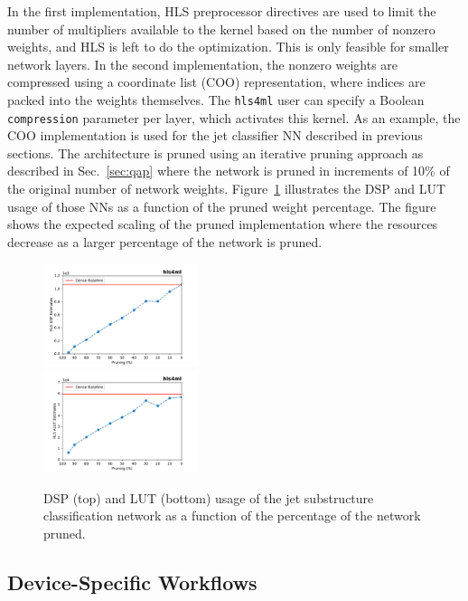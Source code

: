 \documentclass[tinyml]{acmart}
\newcommand{\hlsfml}{\texttt{hls4ml}\xspace}
\begin{document}
In the first implementation, HLS preprocessor directives are used to limit the number of multipliers available to the kernel based on the number of nonzero weights, and HLS is left to do the optimization.
This is only feasible for smaller network layers.
In the second implementation, the nonzero weights are compressed using a coordinate list (COO) representation, where indices are packed into the weights themselves.
The \hlsfml user can specify a Boolean \texttt{compression} parameter per layer, which activates this kernel.
As an example, the COO implementation is used for the jet classifier NN described in previous sections.
The architecture is pruned using an iterative pruning approach as described in Sec.~\ref{sec:qap} where the network is pruned in increments of 10\% of the original number of network weights.
Figure~\ref{fig:sparse} illustrates the DSP and LUT usage of those NNs as a function of the pruned weight percentage.
The figure shows the expected scaling of the pruned implementation where the resources decrease as a larger percentage of the network is pruned.

\begin{figure}[t!]
\centering
\includegraphics[width=0.40\textwidth]{Figs/pr_scan_dsp_histogram.pdf} \\
\includegraphics[width=0.40\textwidth]{Figs/pr_scan_lut_histogram.pdf}
\caption{DSP (top) and LUT (bottom) usage of the jet substructure classification network as a function of the percentage of the network pruned.}
\label{fig:sparse}
\end{figure}

\subsection{Device-Specific Workflows}
\end{document}
